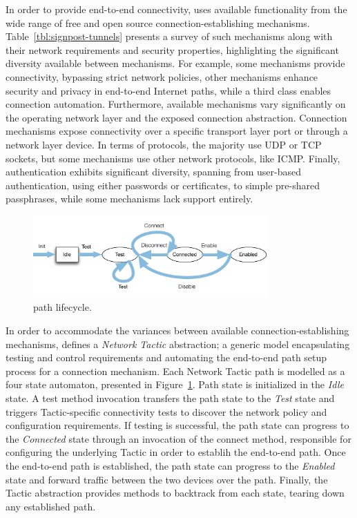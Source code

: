 In order to provide end-to-end connectivity, \signpost uses available
functionality from the wide range of free and open source
connection-establishing mechanisms. Table~\ref{tbl:signpost-tunnels} presents a
survey of such mechanisms along with their network requirements and security
properties, highlighting the significant diversity available between
mechanisms.  For example, some mechanisms provide connectivity, bypassing
strict network policies,  other mechanisms enhance security and privacy in
end-to-end Internet paths, while a third class enables connection automation.
Furthermore, available mechanisms vary significantly on the operating network
layer and the exposed connection abstraction. Connection mechanisms expose
connectivity over a specific transport layer port or through a network layer
device.  In terms of protocols, the majority use UDP or TCP sockets, but some
mechanisms use other network protocols, like ICMP\@.  Finally, authentication
exhibits significant diversity, spanning from user-based authentication, using
either passwords or certificates, to simple pre-shared passphrases, while some
mechanisms lack support entirely. 

\begin{figure}
  \begin{center}
	\includegraphics[width=0.8\textwidth]{Chapter3/Chapter3Figs/signpost-tactic}
  \end{center}
  \caption{\signpost path lifecycle.}
  \label{fig:signpost-tactic}
\end{figure}

In order to accommodate the variances between available connection-establishing
mechanisms, \signpost defines a \textit{Network Tactic} abstraction; a generic
model encapsulating testing and control requirements and automating the
end-to-end path setup process for a connection mechanism.  Each Network Tactic
path is modelled as a four state automaton, presented in
Figure~\ref{fig:signpost-tactic}.  Path state is initialized in the \emph{Idle}
state.  A test method invocation transfers the path state to the \emph{Test} state
and triggers Tactic-specific connectivity tests to discover the network policy
and configuration requirements.  If testing is successful, the path state can
progress to the \emph{Connected} state through an invocation of the connect
method, responsible for configuring the underlying Tactic in order to establih
the end-to-end path. Once the end-to-end path is established, the path state can
progress to the \emph{Enabled} state and forward traffic between the two
devices over the path. Finally, the Tactic abstraction provides methods to
backtrack from each state, tearing down any established path. 

